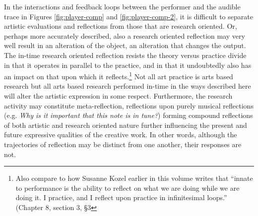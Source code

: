 In the interactions and feedback loops between the performer and the audible trace in Figures \ref{fig:player-comp} and \ref{fig:player-comp-2}, it is difficult to separate artistic evaluations and reflections from those that are research oriented. Or, perhaps more accurately described, also a research oriented reflection may very well result in an alteration of the object, an alteration that changes the output. The in-time research oriented reflection resists the theory versus practice divide in that it operates in parallel to the practice, and in that it undoubtedly also has an impact on that upon which it reflects.\footnote{Also compare to how Susanne Kozel earlier in this volume writes that ``innate to performance is the ability to reflect on what we are doing while we are doing it. I practice, and I reflect upon practice in infinitesimal loops.'' (Chapter 8, section 3, \S3} Not all art practice is arts based research but all arts based research performed in-time in the ways described here will alter the artistic expression in some respect. Furthermore, the research activity may constitute meta-reflection, reflections upon purely musical reflections (e.g. \emph{Why is it important that this note is in tune?}) forming compound reflections of both artistic and research oriented nature further influencing the present and future expressive qualities of the creative work. In other words, although the trajectories of reflection may be distinct from one another, their responses are not. %




